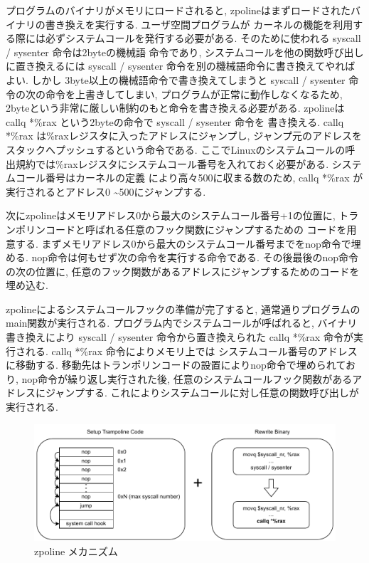 \documentclass[a4paper,11pt]{jreport}
\begin{document}
プログラムのバイナリがメモリにロードされると, zpolineはまずロードされたバイナリの書き換えを実行する. ユーザ空間プログラムが
カーネルの機能を利用する際には必ずシステムコールを発行する必要がある. そのために使われる syscall / sysenter 命令は2byteの機械語
命令であり, システムコールを他の関数呼び出しに置き換えるには syscall / sysenter 命令を別の機械語命令に書き換えてやればよい. しかし
3byte以上の機械語命令で書き換えてしまうと syscall / sysenter 命令の次の命令を上書きしてしまい, プログラムが正常に動作しなくなるため, 
2byteという非常に厳しい制約のもと命令を書き換える必要がある. zpolineは callq *\%rax という2byteの命令で syscall / sysenter 命令を
書き換える. callq *\%rax は\%raxレジスタに入ったアドレスにジャンプし, ジャンプ元のアドレスをスタックへプッシュするという命令である. 
ここでLinuxのシステムコールの呼出規約では\%raxレジスタにシステムコール番号を入れておく必要がある. システムコール番号はカーネルの定義
により高々500に収まる数のため, callq *\%rax が実行されるとアドレス0 \textasciitilde 500にジャンプする.

次にzpolineはメモリアドレス0から最大のシステムコール番号+1の位置に, トランポリンコードと呼ばれる任意のフック関数にジャンプするための
コードを用意する. まずメモリアドレス0から最大のシステムコール番号までをnop命令で埋める. nop命令は何もせず次の命令を実行する命令である.
その後最後のnop命令の次の位置に, 任意のフック関数があるアドレスにジャンプするためのコードを埋め込む.

zpolineによるシステムコールフックの準備が完了すると, 通常通りプログラムのmain関数が実行される. プログラム内でシステムコールが呼ばれると, 
バイナリ書き換えにより syscall / sysenter 命令から置き換えられた callq *\%rax 命令が実行される. callq *\%rax 命令によりメモリ上では
システムコール番号のアドレスに移動する. 移動先はトランポリンコードの設置によりnop命令で埋められており, nop命令が繰り返し実行された後, 
任意のシステムコールフック関数があるアドレスにジャンプする. これによりシステムコールに対し任意の関数呼び出しが実行される.



\begin{figure}[h]
	\begin{minipage}[b]{1\columnwidth}
		\centering
		\includegraphics[width=0.9\linewidth]{./figure/zpoline_mechanism.pdf}
		\caption{zpoline メカニズム}
		\label{fig:Zpoline mechanism}
	\end{minipage}
\end{figure}
\end{document}
